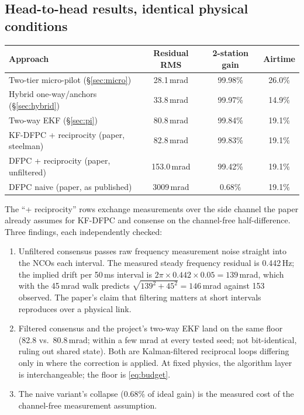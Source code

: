 \documentclass[10pt]{article}
\begin{document}
\subsection{Head-to-head results, identical physical conditions}
\begin{center}
\begin{tabular}{lccc}
\toprule
Approach & Residual RMS & 2-station gain & Airtime\\
\midrule
Two-tier micro-pilot (\S\ref{sec:micro}) & 28.1\,mrad & 99.98\% & 26.0\%\\
Hybrid one-way/anchors (\S\ref{sec:hybrid}) & 33.8\,mrad & 99.97\% & 14.9\%\\
Two-way EKF (\S\ref{sec:pi}) & 80.8\,mrad & 99.84\% & 19.1\%\\
KF-DFPC + reciprocity (paper, steelman) & 82.8\,mrad & 99.83\% & 19.1\%\\
DFPC + reciprocity (paper, unfiltered) & 153.0\,mrad & 99.42\% & 19.1\%\\
DFPC naive (paper, as published) & 3009\,mrad & 0.68\% & 19.1\%\\
\bottomrule
\end{tabular}
\end{center}
The ``+ reciprocity'' rows exchange measurements over the side channel
the paper already assumes for KF-DFPC and consense on the channel-free
half-difference. Three findings, each independently checked:
\begin{enumerate}
\item Unfiltered consensus passes raw frequency measurement noise
straight into the NCOs each interval. The measured steady frequency
residual is 0.442\,Hz; the implied drift per 50\,ms interval is
$2\pi\times0.442\times0.05=139$\,mrad, which with the 45\,mrad walk
predicts $\sqrt{139^2+45^2}=146$\,mrad against 153 observed. The paper's
claim that filtering matters at short intervals reproduces over a
physical link.
\item Filtered consensus and the project's two-way EKF land on the same
floor (82.8 vs.\ 80.8\,mrad; within a few mrad at every tested seed; not
bit-identical, ruling out shared state). Both are Kalman-filtered
reciprocal loops differing only in where the correction is applied. At
fixed physics, the algorithm layer is interchangeable; the floor is
\eqref{eq:budget}.
\item The naive variant's collapse (0.68\% of ideal gain) is the
measured cost of the channel-free measurement assumption.
\end{enumerate}
\end{document}
